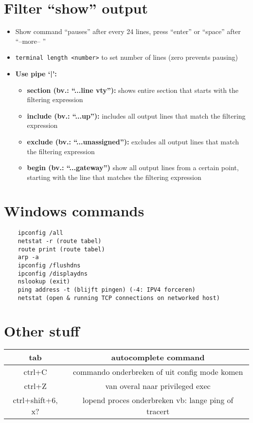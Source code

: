 \documentclass[10pt, a4paper]{article}
\begin{document}
	\section{Filter ``show'' output}
	\begin{itemize}[noitemsep,nolistsep]
		\item Show command ``pauses'' after every 24 lines, press ``enter'' or ``space'' after ``--more-- ''
		\item \texttt{terminal length <number>} to set number of lines (zero prevents pausing)\\
		\item \textbf{Use pipe `|':}
		\begin{itemize}[noitemsep,nolistsep]
			\item \textbf{section (bv.: ``...line vty''):} shows entire section that starts with the filtering expression
			\item \textbf{include (bv.: ``...up''):} includes all output lines that match the filtering expression
			\item \textbf{exclude (bv.: ``...unassigned''):} excludes all output lines that match the filtering expression
			\item \textbf{begin (bv.: ``...gateway'')} show all output lines from a certain point, starting with the line that matches the filtering expression\\
		\end{itemize}
	\end{itemize}

	\section{Windows commands}
	\begin{lstlisting}
	ipconfig /all
	netstat -r (route tabel)
	route print (route tabel)
	arp -a
	ipconfig /flushdns
	ipconfig /displaydns
	nslookup (exit)
	ping address -t (blijft pingen) (-4: IPV4 forceren)
	netstat (open & running TCP connections on networked host)
	\end{lstlisting}

	\section{Other stuff}
	\begin{tabular}{|c|c|}
		\hline \rule[-1ex]{0pt}{4ex} tab & autocomplete command \\
		\hline \rule[-1ex]{0pt}{4ex} ctrl+C  & commando onderbreken  of uit config mode komen\\
		\hline \rule[-1ex]{0pt}{4ex} ctrl+Z & van overal naar privileged exec\\
		\hline \rule[-1ex]{0pt}{4ex} ctrl+shift+6, x? & lopend proces onderbreken vb: lange ping of tracert\\
		\hline
	\end{tabular} \\ \\
\end{document}
